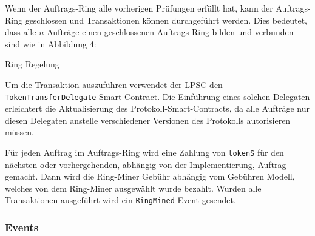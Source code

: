 \documentclass[UTF8,nofonts]{article}
\makeatletter
\newenvironment{figurehere}
 {\def\@captype{figure}}
 {}
\makeatother
\begin{document}
\begin{multicols}{2}
Wenn der Auftrags-Ring alle vorherigen Prüfungen erfüllt hat, kann der Auftrags-Ring geschlossen und Transaktionen können durchgeführt werden. Dies bedeutet, dass alle $n$ Aufträge einen geschlossenen Auftrags-Ring bilden und verbunden sind wie in Abbildung 4:

\begin{center}
\begin{figurehere}
\centering
{}
\caption{Ring Regelung}
\label{fig:settlement}
\end{figurehere}
\end{center}

Um die Transaktion auszuführen verwendet der LPSC den \verb|TokenTransferDelegate| Smart-Contract. Die Einführung eines solchen Delegaten erleichtert die Aktualisierung des Protokoll-Smart-Contracts, da alle Aufträge nur diesen Delegaten anstelle verschiedener Versionen des Protokolls autorisieren müssen.

Für jeden Auftrag im Auftrags-Ring wird eine Zahlung von \verb|tokenS| für den nächsten oder vorhergehenden, abhängig von der Implementierung, Auftrag gemacht. Dann wird die Ring-Miner Gebühr abhängig vom Gebühren Modell, welches von dem Ring-Miner ausgewählt wurde bezahlt. Wurden alle Transaktionen ausgeführt wird ein \verb|RingMined| Event gesendet.

\subsubsection{Events\label{sec:events}}


\end{multicols}
\end{document}
